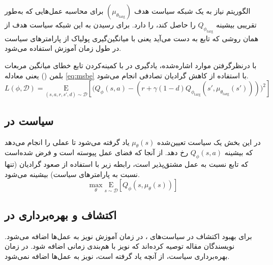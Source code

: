           
          الگوریتم
           نیاز به یک شبکه سیاست هدف
           $(\mu_{\theta_{\text{targ}}})$
            برای محاسبه عمل‌هایی که به‌طور تقریبی بیشینه
            $Q_{\phi_{\text{targ}}}$
             را حاصل کند، را دارد. برای رسیدن به این شبکه سیاست هدف
              از همان روشی که تابع  به دست می‌آید یعنی با میانگین‌گیری پولیاک از پارامترهای سیاست در طول زمان آموزش استفاده می‌شود.
          
          
          با درنظرگرفتن موارد اشاره‌شده، یادگیری  در  با کمینه‌کردن تابع خطای میانگین مربعات بلمن () یعنی معادله \eqref{eq:msbe} با استفاده از کاهش گرادیان تصادفی
           انجام می‌شود.
          \begin{equation}\label{eq:msbe}
          	L(\phi, {\mathcal D}) = \underset{(s,a,r,s',d) \sim {\mathcal D}}{{\mathrm E}}\left[
          	\Bigg( Q_{\phi}(s,a) - \left(r + \gamma (1 - d) Q_{\phi_{\text{targ}}}(s', \mu_{\theta_{\text{targ}}}(s')) \right) \Bigg)^2
          	\right]
          \end{equation}
          
          
          \subsection{ سیاست
          	در 
          }
  در این بخش یک سیاست تعیین‌شده 
  $\mu_{\theta}(s)$
   یاد گرفته می‌شود تا عملی را انجام می‌دهد که بیشینه 
   $Q_{\phi}(s,a)$
    رخ دهد. از آنجا که فضای عمل پیوسته است و فرض شده‌است که تابع  نسبت به عمل مشتق‌پذیر است، رابطه زیر با استفاده از صعود گرادیان
     (تنها نسبت به پارامترهای سیاست) بیشینه می‌شود.
     \begin{equation}
     	\max_{\theta} \underset{s \sim {\mathcal D}}{{\mathrm E}}\left[ Q_{\phi}(s, \mu_{\theta}(s)) \right]
     \end{equation}
     
     
     
     \subsection{اکتشاف و بهره‌برداری در 
     }
       برای بهبود اکتشاف
        در سیاست‌های ، در زمان آموزش نویز به عمل‌ها اضافه می‌شود. نویسندگان مقاله
          \cite{silver2014deterministic}
           توصیه کرده‌اند که نویز 
        با هم‌بندی زمانی اضافه شود.
        در زمان بهره‌برداری سیاست، از آنچه یاد گرفته است، نویز به عمل‌ها اضافه نمی‌شود.
        
